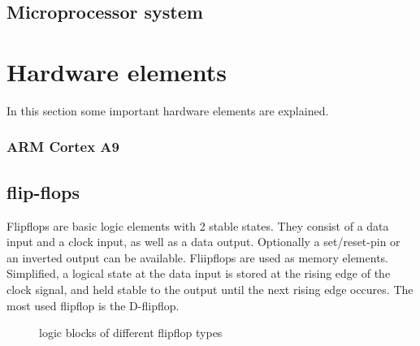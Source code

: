 \subsection{Microprocessor system}

\section{Hardware elements}
In this section some important hardware elements are explained.

\subsubsection{ARM Cortex A9}
\subsection{flip-flops}
Flipflops are basic logic elements with 2 stable states. They consist of a data input and a clock input, as well as a data output. Optionally a set/reset-pin or an inverted output can be available. Fliipflops are used as memory elements. Simplified, a logical state at the data input is stored at the rising edge of the clock signal, and held stable to the output until the next rising edge occures. The most used flipflop is the D-flipflop.
\begin{figure}
\begin{center}
\caption{logic blocks of different flipflop types}
\end{center}
\end{figure}


